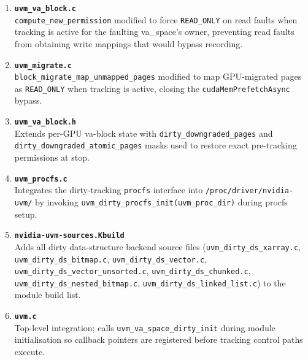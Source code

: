 \begin{enumerate}
    \item \textbf{\texttt{uvm\_va\_block.c}}\\
          \texttt{compute\_new\_permission} modified to
          force \texttt{READ\_ONLY} on read faults when tracking is active for the
          faulting va\_space's owner, preventing read faults from obtaining write
          mappings that would bypass recording.\\

    \item \textbf{\texttt{uvm\_migrate.c}}\\
          \texttt{block\_migrate\_map\_unmapped\_pages}
          modified to map GPU-migrated pages as \texttt{READ\_ONLY} when tracking is
          active, closing the \texttt{cudaMemPrefetchAsync} bypass.\\

    \item \textbf{\texttt{uvm\_va\_block.h}}\\
          Extends per-GPU va-block state with
          \texttt{dirty\_downgraded\_pages} and
          \texttt{dirty\_downgraded\_atomic\_pages} masks used to restore exact
          pre-tracking permissions at stop.\\

    \item \textbf{\texttt{uvm\_procfs.c}}\\
          Integrates the dirty-tracking \texttt{procfs}
          interface into \texttt{/proc/driver/nvidia-uvm/} by invoking
          \texttt{uvm\_dirty\_procfs\_init(uvm\_proc\_dir)} during procfs setup.\\

    \item \textbf{\texttt{nvidia-uvm-sources.Kbuild}}\\
          Adds all dirty data-structure backend
          source files (\texttt{uvm\_dirty\_ds\_xarray.c},
          \texttt{uvm\_dirty\_ds\_bitmap.c},
          \texttt{uvm\_dirty\_ds\_vector.c},
          \texttt{uvm\_dirty\_ds\_vector\_unsorted.c},
          \texttt{uvm\_dirty\_ds\_chunked.c},
          \texttt{uvm\_dirty\_ds\_nested\_bitmap.c},
          \texttt{uvm\_dirty\_ds\_linked\_list.c}) to the module build list.\\

    \item \textbf{\texttt{uvm.c}}\\
          Top-level integration; calls
          \texttt{uvm\_va\_space\_dirty\_init} during module initialisation so
          callback pointers are registered before tracking control paths execute.
\end{enumerate}

